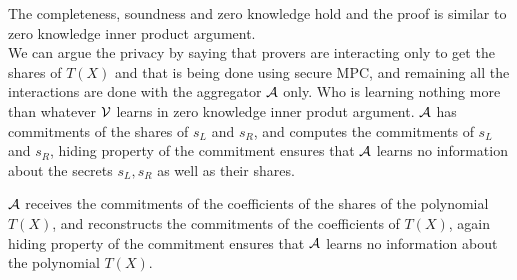 \begin{comment}
\subsubsection{Completeness} Consider the provers are honest i.e. $\cP_1,\ldots, \cP_N$ together hold the witness i.e. equation (5) is true, then the checks succeed. We will see one by one how all the checks succeed.\\
The first check succeeds because:
\begin{align*}
	h^{\tau_x}g^{\hat{t}} &= h^{\delta+\tau_1 x+ \tau_2 x^2}\cdot g^{\langle \bm{a},\bm{b}\rangle + t_1x+t_2x^2}\\
	&= h^{\sum\limits_{i=1}^N(\delta_i+\tau^i_1x+\tau^i_2x^2)}\cdot g^{\sum\limits_{i=1}^N (t^i_0+t^i_1x+t^i_2x^2)}\\
	&= \prod\limits_{i=1}^N h^{\delta_i}.h^{\tau^i_1x}.h^{\tau^i_2x^2}\prod\limits_{i=1}^N g^{t_0}.g^{t^i_1x}.g^{t^i_2x^2}\\
	&= (h^{\delta}\cdot g^{\langle \bm{a},\bm{b}\rangle})\cdot(h^{\tau_1}g^{t_1})^x\cdot(h^{\tau_2}g^{t_2})^{x^2}\\
	&= V\cdot T_1^x \cdot T_2^{x^2}
\end{align*} 
The second check succeeds because:
\begin{align*}
	P\cdot S^x &= h^{\sigma}\bm{g}^{\bm{a}}\bm{h}^{\bm{b}}\cdot (h^{\rho}\bm{g}^{\bm{s}_L}\bm{h}^{\bm{s}_R})^x\\
	&= h
\end{align*}
\subsubsection{Soundness}
\end{comment}
The completeness, soundness and zero knowledge hold and the proof is similar to zero knowledge inner product argument.\\
We can argue the privacy by saying that provers are interacting only to get the shares of $T(X)$ and that is being done using secure MPC, and remaining all the interactions are done with the aggregator ${\cal A}$ only. Who is learning nothing more than whatever ${\cal V}$ learns in zero knowledge inner produt argument. 
${\cal A}$ has commitments of the shares of $s_L$ and $s_R$, and computes the commitments of $s_L$ and $s_R$, hiding property of the commitment ensures that ${\cal A}$ learns no information about the secrets $s_L, s_R$ as well as their shares.

${\cal A}$ receives the commitments of the coefficients of the shares of the polynomial $T(X)$, and reconstructs the commitments of the coefficients of $T(X)$, again hiding property of the commitment ensures that ${\cal A}$ learns no information about the polynomial $T(X)$.

